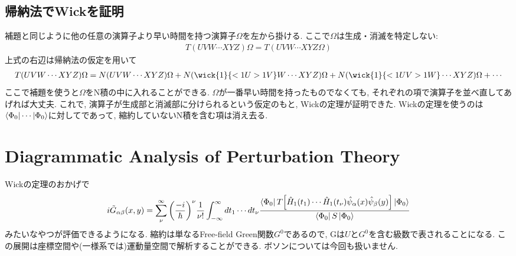 \documentclass[10.5pt,a4paper]{jreport}
\newcommand{\hpsi}{\hat{\psi}}
\begin{document}
\subsection{帰納法でWickを証明}
補題と同じように他の任意の演算子より早い時間を持つ演算子$\Omega$を左から掛ける. ここで$\Omega$は生成・消滅を特定しない:
\begin{eqnarray}
  T(UVW\cdots XYZ)\Omega = T(UVW\cdots XYZ\Omega)
\end{eqnarray}
上式の右辺は帰納法の仮定を用いて
\begin{eqnarray}
  T(UVW\cdots XYZ)\Omega = N(UVW\cdots XYZ)\Omega + N(\wick{1}{<1U >1V}W\cdots XYZ)\Omega + N(\wick{1}{<1U V>1W}\cdots XYZ)\Omega + \cdots
\end{eqnarray}
ここで補題を使うと$\Omega$をN積の中に入れることができる. $\Omega$が一番早い時間を持ったものでなくても, それぞれの項で演算子を並べ直してあげれば大丈夫. これで, 演算子が生成部と消滅部に分けられるという仮定のもと, Wickの定理が証明できた. Wickの定理を使うのは$\bra{\Phi_0}\cdots\ket{\Phi_0}$に対してであって, 縮約していないN積を含む項は消え去る. 
\section{Diagrammatic Analysis of Perturbation Theory}
Wickの定理のおかげで
\begin{eqnarray}
  i\tilde{G}_{\alpha\beta}(x, y) = \sum_\nu^\infty \qty(\frac{-i}{\hbar})^\nu \frac{1}{\nu!}\int_{-\infty}^\infty dt_1\cdots dt_\nu\frac{\bra{\Phi_0}T\qty[\hat{H}_1(t_1)\cdots\hat{H}_1(t_\nu)\hpsi_\alpha(x)\hpsi_\beta(y)]\ket{\Phi_0}}{\bra{\Phi_0}S\ket{\Phi_0}}
\end{eqnarray}
みたいなやつが評価できるようになる. 縮約は単なるFree-field Green関数$G^0$であるので, Gは$U$と$G^0$を含む級数で表されることになる. この展開は座標空間や(一様系では)運動量空間で解析することができる. ボソンについては今回も扱いません.
\end{document}
